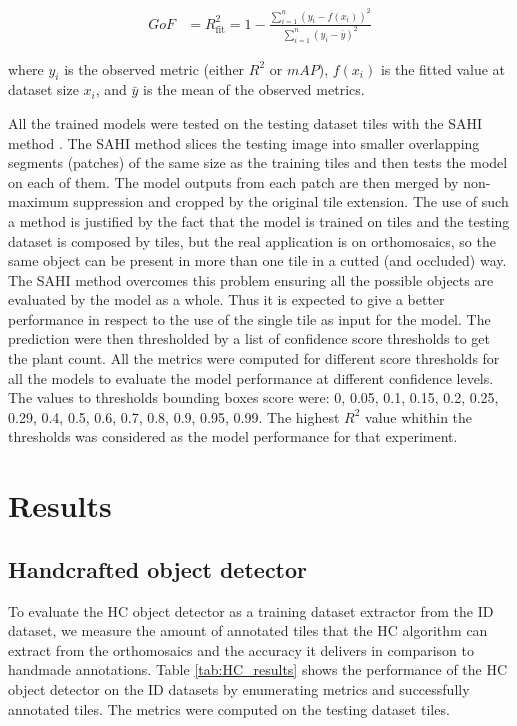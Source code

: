 \documentclass[journal,article,submit,pdftex,moreauthors]{Definitions/mdpi}
\begin{document}
\begin{align}
\text{$GoF$} &= R^2_{\text{fit}} = 1 - \frac{\sum_{i=1}^{n} (y_i - f(x_i))^2}{\sum_{i=1}^{n} (y_i - \bar{y})^2}
\end{align}

where $y_i$ is the observed metric (either $R^2$ or $mAP$), $f(x_i)$ is the 
fitted value at dataset size $x_i$, and $\bar{y}$ is the mean of the observed 
metrics.

All the trained models were tested on the testing dataset tiles with the SAHI method \cite{akyonSlicingAidedHyper2022}.
The SAHI method slices the testing image into smaller overlapping segments (patches) 
of the same size as the training tiles and then tests the model on each of them. 
The model outputs from each patch are then merged by non-maximum suppression and 
cropped by the original tile extension.
The use of such a method is justified by the fact that the model is trained on tiles and
the testing dataset is composed by tiles, but the real application is on orthomosaics, so
the same object can be present in more than one tile in a cutted (and occluded) way.
The SAHI method overcomes this problem ensuring all the possible objects are evaluated by the
model as a whole. Thus it is expected to give a better performance in respect to the use of the
single tile as input for the model.
The prediction were then thresholded by a list of confidence score thresholds to get the plant count.
All the metrics were computed for different score thresholds for all the models
to evaluate the model performance at different confidence levels.
The values to thresholds bounding boxes score were: 0, 0.05, 0.1, 0.15, 0.2, 0.25, 0.29, 0.4, 0.5, 0.6, 0.7, 0.8, 0.9, 0.95, 0.99.
The highest $R^2$ value whithin the thresholds was considered as the model 
performance for that experiment.
\section{Results}

\subsection{Handcrafted object detector}

To evaluate the HC object detector as a training dataset extractor from the ID dataset,
we measure the amount of annotated tiles that the HC algorithm can extract from the orthomosaics
and the accuracy it delivers in comparison to handmade annotations.
Table \ref{tab:HC_results} shows the performance of the HC object detector on the ID datasets 
by enumerating metrics and successfully annotated tiles. The metrics were computed
on the testing dataset tiles.
\end{document}
